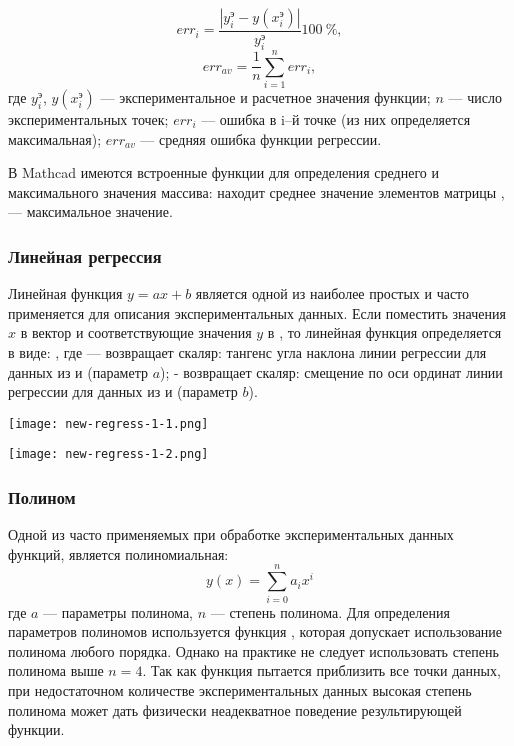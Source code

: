 \begin{equation}
err_i= \dfrac{\left| y_i^э - y(x^э_i) \right|}{y_i^э} 100\ \% ,
\end{equation}
\begin{equation}
err_{av}=\dfrac{1}{n}\sum\limits_{i=1}^{n} err_i ,
\end{equation}
где $y_i^э$, $y(x_i^э)$ --- экспериментальное и расчетное значения функции; $n$ --- число экспериментальных точек; $err_i$ --- ошибка в i–й точке (из них определяется максимальная); $err_{av}$ --- средняя ошибка функции регрессии.

В Mathcad имеются встроенные функции для определения среднего и максимального значения массива:  находит среднее значение элементов матрицы ,  --- максимальное значение.

\subsubsection{Линейная регрессия}
Линейная функция $y=ax + b $ является одной из наиболее простых и часто применяется для описания экспериментальных данных. 
Если поместить значения $x$ в вектор  и соответствующие значения $y$ в , то линейная функция определяется в виде:
,
где  --- возвращает скаляр: тангенс угла наклона линии регрессии для данных из  и  (параметр $a$);
 - возвращает скаляр: смещение по оси ординат линии регрессии для данных из  и  (параметр $b$).


\begin{center}
	\texttt{[image: new-regress-1-1.png]}
\end{center}
\begin{center}
	\texttt{[image: new-regress-1-2.png]}
\end{center}

\subsubsection{Полином}
Одной из  часто применяемых при обработке экспериментальных данных функций, является полиномиальная:
\begin{equation}
y(x)= \sum_{i=0}^{n} a_i x^i
\end{equation}
где $a$ --- параметры полинома, $n$ --- степень полинома. Для определения параметров полиномов используется функция , которая допускает использование полинома любого порядка. Однако на практике не следует использовать степень полинома выше $n = 4$. Так как функция  пытается приблизить все точки данных, при недостаточном количестве экспериментальных данных высокая степень полинома может дать физически неадекватное поведение результирующей функции.

